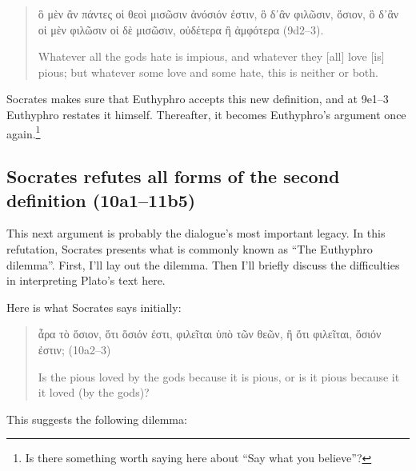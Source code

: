 \documentclass[11pt]{article}
\begin{document}
\begin{quote}

    {\g
    ὃ μὲν ἂν πάντες οἱ θεοὶ μισῶσιν ἀνόσιόν ἐστιν, ὃ δ᾽ἂν φιλῶσιν, ὅσιον,
    ὃ δ᾽ἂν οἱ μὲν φιλῶσιν οἱ δὲ μισῶσιν, οὐδέτερα ἢ ἀμφότερα
    } (9d2--3).

    Whatever all the gods hate is impious, and whatever they [all] love
    [is] pious; but whatever some love and some hate, this is neither or
    both.

\end{quote}

Socrates makes sure that Euthyphro accepts this new definition, and at
9e1--3 Euthyphro restates it himself.  Thereafter, it becomes Euthyphro's
argument once again.\footnote{Is there something worth saying here about
``Say what you believe''?}


\subsection{Socrates refutes all forms of the second definition (10a1--11b5)}

This next argument is probably the dialogue's most important legacy.  In
this refutation, Socrates presents what is commonly known as ``The Euthyphro
dilemma''.  First, I'll lay out the dilemma.  Then I'll briefly discuss the
difficulties in interpreting Plato's text here.

Here is what Socrates says initially:

\begin{quote}

    {\g
    ἆρα τὸ ὅσιον, ὅτι ὅσιόν ἐστι, φιλεῖται ὑπὸ τῶν θεῶν, ἢ ὅτι φιλεῖται,
    ὅσιόν ἐστιν;
    } (10a2--3)

    Is the pious loved by the gods because it is pious, or is it pious
    because it it loved (by the gods)?

\end{quote}

This suggests the following dilemma:
\end{document}
